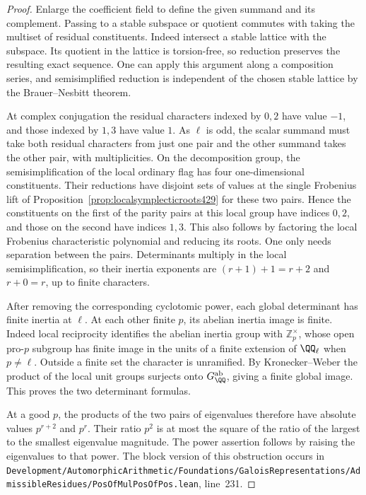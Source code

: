 \documentclass[a4paper,11pt]{article}
\theoremstyle{definition}
\theoremstyle{remark}
\newcommand{\ZZ}{\mathbb Z}\newcommand{\ord}{\operatorname{ord}}
\newcommand{\srcloc}[2]{{\small\nolinkurl{#1.lean}}, line~#2}
\numberwithin{equation}{section}
\begin{document}
\begin{proof}
Enlarge the coefficient field to define the given summand and
its complement. Passing to a stable subspace or quotient
commutes with taking the multiset of residual constituents.
Indeed intersect a stable lattice with the subspace. Its
quotient in the lattice is torsion-free, so reduction preserves
the resulting exact sequence. One can apply this argument
along a composition series, and semisimplified reduction is
independent of the chosen stable lattice by the
Brauer--Nesbitt theorem.

At complex conjugation the residual characters indexed by
\(0,2\) have value \(-1\), and those indexed by \(1,3\)
have value \(1\). As \(\ell\) is odd, the scalar summand must
take both residual characters from just one pair and the other
summand takes the other pair, with multiplicities.
On the decomposition group, the semisimplification of the
local ordinary flag has four one-dimensional constituents.
Their reductions have disjoint sets of values at the single
Frobenius lift of Proposition~\ref{prop:localsymplecticroots429}
for these two pairs. Hence the constituents on the first
of the parity pairs at this local group have indices \(0,2\),
and those on the second have indices \(1,3\). This also follows
by factoring the local Frobenius characteristic polynomial and
reducing its roots. One only needs separation between the pairs.
Determinants multiply in the local semisimplification, so their
inertia exponents are \((r+1)+1=r+2\) and \(r+0=r\), up to
finite characters.

After removing the corresponding cyclotomic power, each global
determinant has finite inertia at \(\ell\). At each other
finite \(p\), its abelian inertia image is finite. Indeed
local reciprocity identifies the abelian inertia group with
\(\ZZ_p^\times\), whose open pro-\(p\) subgroup has finite
image in the units of a finite extension of \(\QQ_\ell\)
when \(p\ne\ell\). Outside a finite set the character is
unramified. By Kronecker--Weber the product of the local unit
groups surjects onto \(G_\QQ^{\rm ab}\), giving a finite
global image. This proves the two determinant formulas.

At a good \(p\), the products of the two pairs of eigenvalues
therefore have absolute values \(p^{r+2}\) and \(p^r\).
Their ratio \(p^2\) is at most the square of the ratio of the
largest to the smallest eigenvalue magnitude. The power
assertion follows by raising the eigenvalues to that power.
The block version of this obstruction occurs in
\srcloc{Development/AutomorphicArithmetic/Foundations/GaloisRepresentations/AdmissibleResidues/PosOfMulPosOfPos}{231}.
\end{proof}
\end{document}
